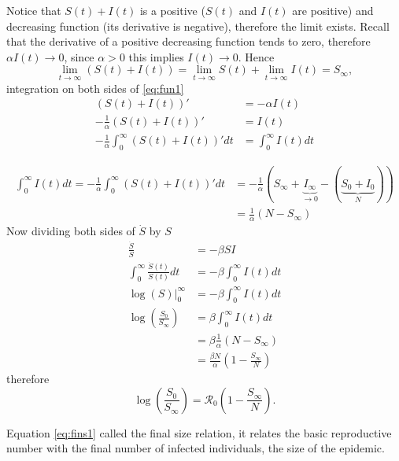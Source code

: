 \documentclass{book}
\begin{document}
Notice that $S(t)+I(t)$ is a positive ($S(t)$ and $I(t)$ are positive) and decreasing function (its derivative is negative), therefore the limit exists. Recall that the derivative of a positive decreasing function tends to zero, therefore $\alpha I(t)\rightarrow 0$, since $\alpha>0$ this implies $I(t)\rightarrow 0$. 
%
Hence
$$\lim_{t\rightarrow \infty} (S(t)+I(t))=\lim_{t\rightarrow \infty} S(t)+\lim_{t\rightarrow \infty}I(t)=S_{\infty},$$
%
integration on both sides of \eqref{eq:fun1}
\begin{align*}
(S(t)+I(t))' &= -\alpha I(t)\\
-\frac{1}{\alpha}(S(t)+I(t))' &= I(t)\\
-\frac{1}{\alpha}\int_0^{\infty} (S(t)+I(t))' dt &= \int_0^{\infty} I(t)dt
\end{align*}
%

\begin{align*}
\int_0^{\infty} I(t)dt=-\frac{1}{\alpha}\int_0^{\infty} (S(t)+I(t))' dt &= -\frac{1}{\alpha}(S_\infty+\underbrace{I_\infty}_{\rightarrow 0}-(\underbrace{S _0+I_0}_{N}))\\
&=\frac{1}{\alpha}(N-S_\infty)
\end{align*}
Now dividing  both sides of $\dot{S}$  by $S$
%
\begin{align*}
\frac{\dot{S}}{S}&=-\beta S I\\
\int_0^\infty \frac{\dot{S}(t)}{S(t)} dt&=-\beta \int_0^\infty  I(t)dt\\
\log(S)\Big|_{0}^\infty &= -\beta \int_0^\infty  I(t)dt\\
\log\left( \frac{S_0}{S_\infty}\right)  &= \beta \int_0^\infty  I(t)dt\\
&= \beta\frac{1}{\alpha}(N-S_\infty)\\
&= \frac{\beta N}{\alpha}\left( 1-\frac{S_\infty}{N}\right) 
\end{align*}
therefore
\begin{equation} \label{eq:fins1}
    \log\left( \frac{S_0}{S_\infty}\right)  = \mathcal{R}_0\left( 1-\frac{S_\infty}{N}\right).
\end{equation}

Equation \eqref{eq:fins1} called the final size relation, it relates the basic reproductive number with the final number of infected individuals, the size of the epidemic.
\end{document}
